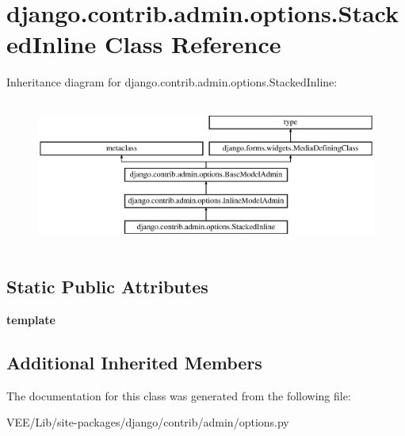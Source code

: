 \hypertarget{classdjango_1_1contrib_1_1admin_1_1options_1_1_stacked_inline}{}\section{django.\+contrib.\+admin.\+options.\+Stacked\+Inline Class Reference}
\label{classdjango_1_1contrib_1_1admin_1_1options_1_1_stacked_inline}
Inheritance diagram for django.\+contrib.\+admin.\+options.\+Stacked\+Inline\+:\begin{figure}[H]
\begin{center}
\leavevmode
\includegraphics[height=4.895105cm]{classdjango_1_1contrib_1_1admin_1_1options_1_1_stacked_inline}
\end{center}
\end{figure}
\subsection*{Static Public Attributes}
\begin{DoxyCompactItemize}
\item 
\mbox{\label{classdjango_1_1contrib_1_1admin_1_1options_1_1_stacked_inline_abe6f5dd6c336f58748e0de411270632e}} 
{\bfseries template}
\end{DoxyCompactItemize}
\subsection*{Additional Inherited Members}


The documentation for this class was generated from the following file\+:\begin{DoxyCompactItemize}
\item 
V\+E\+E/\+Lib/site-\/packages/django/contrib/admin/options.\+py\end{DoxyCompactItemize}
